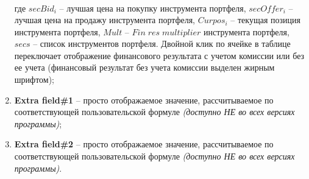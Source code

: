 \begin{enumerate}
\begin{align*}
		\end{align*} 
		где $secBid_i$ -- лучшая цена на покупку инструмента портфеля, $secOffer_i$ -- лучшая цена на продажу инструмента портфеля, $Curpos_i$ -- текущая позиция инструмента
		портфеля, $Mult$ -- $Fin \; res \; multiplier$ инструмента портфеля, $secs$ -- список инструментов портфеля. Двойной клик по ячейке в таблице
		переключает отображение финансового результата с учетом комиссии или без ее учета (финансовый результат без учета комиссии выделен жирным шрифтом);
	\item \textbf{Extra field\#1} -- просто отображаемое значение, рассчитываемое по соответствующей пользовательской формуле \textit{(доступно НЕ во всех версиях программы)};
	\item \textbf{Extra field\#2} -- просто отображаемое значение, рассчитываемое по соответствующей пользовательской формуле \textit{(доступно НЕ во всех версиях программы)}.
\end{enumerate}


